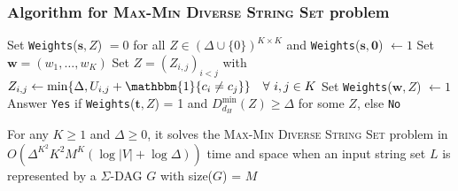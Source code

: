 \documentclass{beamer}
\begin{document}
\begin{frame}
    \frametitle{Algorithm for \textsc{Max-Min Diverse String Set} problem}
    \begin{algorithm}[H] \label{alg:dp}
        \footnotesize{\caption{}}
        \footnotesize{\begin{algorithmic}[1]
                \State Set \texttt{Weights}($\mathbf{s}, Z$) $=0$ for all $Z \in (\Delta \cup \{0\})^{K \times K}$ and \texttt{Weights}($\mathbf{s}, \mathbf{0}$) $\gets 1$
                \State Set $\mathbf{w} = (w_1, \dots, w_K)$
                \State Set $Z = (Z_{i,j})_{i<j}$ with $Z_{i,j} \gets \min \{\Delta, U_{i,j} + \mathbbm{1}\{c_i \neq c_j\}\} \quad \forall ~ i, j \in K$
                \State Set \texttt{Weights}($\mathbf{w}, Z$) $\gets 1$ 
                \EndFor
                \EndFor
                \EndFor
                \EndFor
                \State Answer \texttt{Yes} if \texttt{Weights}($\mathbf{t}, Z$) = 1 and $D_{d_H}^{\text{min}}(Z) \geq \Delta$ for some $Z$, else \texttt{No}
            \end{algorithmic}}
    \end{algorithm}
    \small{For any $K \geq 1$ and $\Delta \geq 0$, it solves the \textsc{Max-Min Diverse String Set} problem in $O(\Delta^{K^2} K^2 M^K (\log |V| + \log \Delta))$ time and space when an input string set $L$ is represented by a $\Sigma$-DAG $G$ with size($G$) = $M$}
\end{frame}
\end{document}
